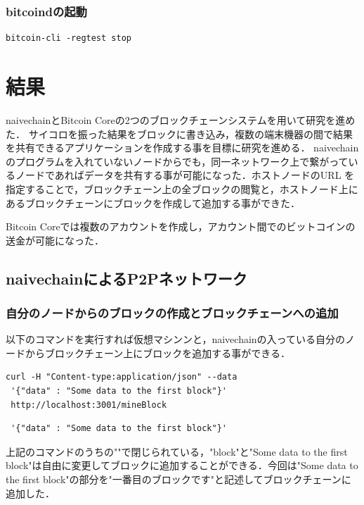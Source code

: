 \subsection{bitcoindの起動}
\begin{verbatim}
bitcoin-cli -regtest stop
\end{verbatim}



\chapter{結果}

naivechainとBitcoin Coreの2つのブロックチェーンシステムを用いて研究を進めた．
サイコロを振った結果をブロックに書き込み，複数の端末機器の間で結果を共有できるアプリケーションを作成する事を目標に研究を進める．
naivechain のプログラムを入れていないノードからでも，同一ネットワーク上で繋がっているノードであればデータを共有する事が可能になった．ホストノードのURL を指定することで，ブロックチェーン上の全ブロックの閲覧と，ホストノード上にあるブロックチェーンにブロックを作成して追加する事ができた．

Bitcoin Coreでは複数のアカウントを作成し，アカウント間でのビットコインの送金が可能になった．


\newpage


\section{naivechainによるP2Pネットワーク}


\subsection{自分のノードからのブロックの作成とブロックチェーンへの追加}
以下のコマンドを実行すれば仮想マシンンと，naivechainの入っている自分のノードからブロックチェーン上にブロックを追加する事ができる．

\begin{verbatim}
curl -H "Content-type:application/json" --data
 '{"data" : "Some data to the first block"}'
 http://localhost:3001/mineBlock
\end{verbatim}


\begin{verbatim}
 '{"data" : "Some data to the first block"}'
\end{verbatim}

上記のコマンドのうちの""で閉じられている，"block"と"Some data to the first block"は自由に変更してブロックに追加することができる．今回は"Some data to the first block"の部分を"一番目のブロックです"と記述してブロックチェーンに追加した．



